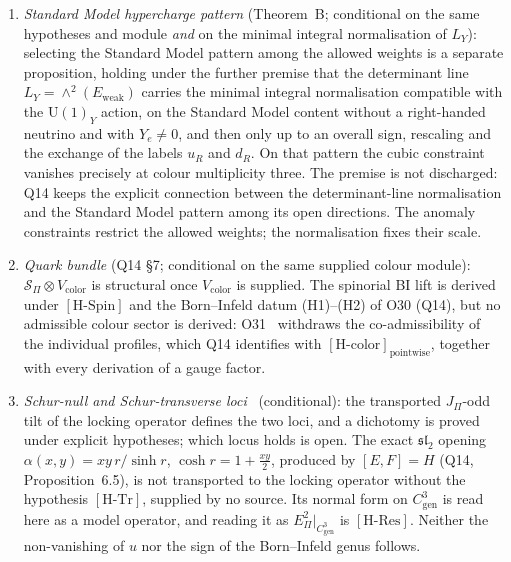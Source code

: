 \documentclass[11pt,a4paper]{article}
\theoremstyle{definition}
\newcommand{\UU}{\mathrm{U}}
\newcommand{\Sbundle}{\mathcal{S}_\Pi}
\newcommand{\Epi}{E_\Pi}
\newcommand{\Cgen}{C^3_{\mathrm{gen}}}
\newcommand{\Ew}{E_{\mathrm{weak}}}
\newcommand{\HSpin}{\ensuremath{[\mathrm{H\text{-}Spin}]}}
\newcommand{\HRes}{\ensuremath{[\mathrm{H\text{-}Res}]}}
\newcommand{\HTr}{\ensuremath{[\mathrm{H\text{-}Tr}]}}
\begin{document}
\begin{enumerate}
        \item \textit{Standard Model hypercharge pattern} (Theorem~B; conditional on the same
        hypotheses and module \emph{and} on the minimal integral normalisation of $L_Y$):
        selecting the Standard Model pattern among the allowed weights is a separate proposition,
        holding under the further premise that the determinant line $L_Y = \wedge^2(\Ew)$
        carries the minimal integral normalisation compatible with the $\UU(1)_Y$ action, on the Standard Model
        content without a right-handed neutrino and with $Y_e \neq 0$, and then only up to an overall sign,
        rescaling and the exchange of the labels $u_R$ and $d_R$.
        On that pattern the cubic constraint vanishes precisely at colour multiplicity three.
        The premise is not discharged: Q14 keeps the explicit connection between the
        determinant-line normalisation and the Standard Model pattern among its open directions.
        The anomaly constraints restrict the allowed weights; the normalisation fixes their scale.

        \item \textit{Quark bundle} (Q14 \S7; conditional on the same supplied colour module):
        $\Sbundle \otimes V_{\mathrm{color}}$ is structural once $V_{\mathrm{color}}$ is supplied.
        The spinorial BI lift is derived under \HSpin{} and the Born--Infeld datum (H1)--(H2) of O30 (Q14), but no
        admissible colour sector is derived:
        O31~\cite{Beau2026a35} withdraws the co-admissibility of the individual profiles, which Q14 identifies with
        $[\mathrm{H\text{-}color}]_{\mathrm{pointwise}}$, together with every derivation of a gauge factor.

        \item \textit{Schur-null and Schur-transverse loci}~\cite{Beau2026prs} (conditional): the transported
        $J_\Pi$-odd tilt of the locking operator defines the two loci, and a dichotomy is proved under explicit
        hypotheses; which locus holds is open.
        The exact $\mathfrak{sl}_2$ opening $\alpha(x,y)=xy\,r/\sinh r$, $\cosh r=1+\tfrac{xy}{2}$, produced by
        $[E,F]=H$ (Q14, Proposition~6.5), is not transported to the locking operator without the hypothesis \HTr{},
        supplied by no source.
        Its normal form on $\Cgen$ is read here as a model operator, and reading it as $\Epi^2|_{\Cgen}$ is \HRes{}.
        Neither the non-vanishing of $u$ nor the sign of the Born--Infeld genus follows.
      \end{enumerate}
\end{document}
